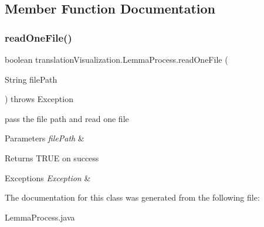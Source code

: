 \subsection{Member Function Documentation}
\mbox{\label{classtranslation_visualization_1_1_lemma_process_a656e29720f5593558d6971ca558c0fec}} 
\subsubsection{\texorpdfstring{read\+One\+File()}{readOneFile()}}
{\footnotesize\ttfamily boolean translation\+Visualization.\+Lemma\+Process.\+read\+One\+File (\begin{DoxyParamCaption}\item[{String}]{file\+Path }\end{DoxyParamCaption}) throws Exception\hspace{0.3cm}{\ttfamily [inline]}}

pass the file path and read one file


\begin{DoxyParams}{Parameters}
{\em file\+Path} & \\
\hline
\end{DoxyParams}
\begin{DoxyReturn}{Returns}
T\+R\+UE on success 
\end{DoxyReturn}

\begin{DoxyExceptions}{Exceptions}
{\em Exception} & \\
\hline
\end{DoxyExceptions}


The documentation for this class was generated from the following file\+:\begin{DoxyCompactItemize}
\item 
Lemma\+Process.\+java\end{DoxyCompactItemize}
